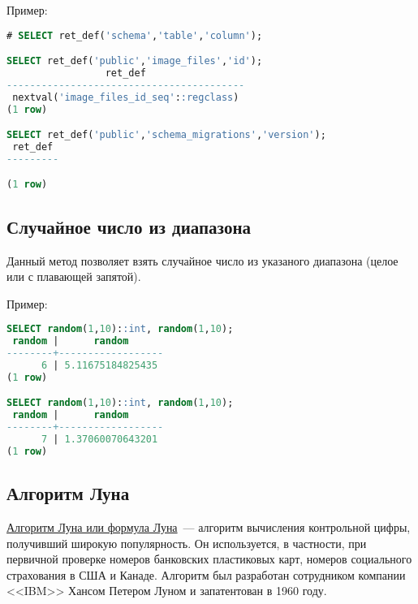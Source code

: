 

Пример:

\begin{lstlisting}[language=SQL,label=lst:snippets7,caption=Узнать значение по умолчанию у поля в таблице. Пример]
# SELECT ret_def('schema','table','column');

SELECT ret_def('public','image_files','id');
                 ret_def
-----------------------------------------
 nextval('image_files_id_seq'::regclass)
(1 row)

SELECT ret_def('public','schema_migrations','version');
 ret_def
---------

(1 row)
\end{lstlisting}

\subsection{Случайное число из диапазона}
Данный метод позволяет взять случайное число из указаного диапазона (целое или с плавающей запятой).



Пример:

\begin{lstlisting}[language=SQL,label=lst:snippets9,caption=Случайное число из диапазона. Пример]
SELECT random(1,10)::int, random(1,10);
 random |      random
--------+------------------
      6 | 5.11675184825435
(1 row)

SELECT random(1,10)::int, random(1,10);
 random |      random
--------+------------------
      7 | 1.37060070643201
(1 row)
\end{lstlisting}

\subsection{Алгоритм Луна}
\href{http://en.wikipedia.org/wiki/Luhn\_algorithm}{Алгоритм Луна или формула Луна}~--- алгоритм вычисления контрольной цифры, получивший широкую популярность. Он используется, в частности, при первичной проверке номеров банковских пластиковых карт, номеров социального страхования в США и Канаде. Алгоритм был разработан сотрудником компании <<IBM>> Хансом Петером Луном и запатентован в 1960 году.

